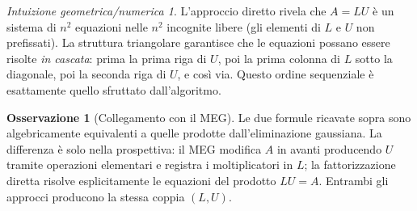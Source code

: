 \documentclass[a4paper,12pt]{article}
\theoremstyle{definition}
\newtheorem{osservazione}{Osservazione}[section]
\theoremstyle{remark}
\newtheorem*{intuizione}{Intuizione geometrica/numerica}
\begin{document}
\begin{intuizione}
L'approccio diretto rivela che $A = LU$ è un sistema di $n^2$ equazioni nelle
$n^2$ incognite libere (gli elementi di $L$ e $U$ non prefissati). La struttura
triangolare garantisce che le equazioni possano essere risolte \emph{in cascata}:
prima la prima riga di $U$, poi la prima colonna di $L$ sotto la diagonale, poi la
seconda riga di $U$, e così via. Questo ordine sequenziale è esattamente quello
sfruttato dall'algoritmo.
\end{intuizione}

\begin{osservazione}[Collegamento con il MEG]
Le due formule ricavate sopra sono algebricamente equivalenti a quelle prodotte
dall'eliminazione gaussiana. La differenza è solo nella prospettiva: il MEG modifica
$A$ in avanti producendo $U$ tramite operazioni elementari e registra i moltiplicatori
in $L$; la fattorizzazione diretta risolve esplicitamente le equazioni del prodotto
$LU = A$. Entrambi gli approcci producono la stessa coppia $(L, U)$.
\end{osservazione}
\end{document}
